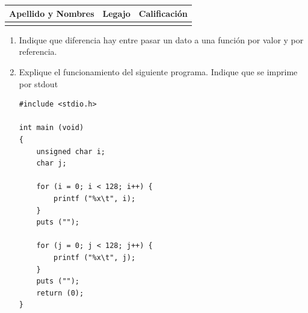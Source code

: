 \documentclass[12pt]{article} %
\begin{document}
\newpage

\noindent
  \begin{center}
   \begin{tabular}{| c | c | c |}
    \hline
     Apellido y Nombres \hspace{8cm} &  Legajo & {Calificación} \\ \hline 
      &	& \\ \hline
   \end{tabular}	
  \end{center}

\noindent


\begin{enumerate}
\item Indique que diferencia hay entre pasar un dato a una función por valor y por referencia.

\item Explique el funcionamiento del siguiente programa. Indique que se imprime por stdout

\begin{lstlisting}
#include <stdio.h>

int main (void)
{
    unsigned char i;
    char j;

    for (i = 0; i < 128; i++) {
        printf ("%x\t", i);
    }
    puts ("");
    
    for (j = 0; j < 128; j++) {
        printf ("%x\t", j);
    }
    puts ("");
    return (0);
}
\end{lstlisting}

\end{enumerate}


 
\end{document}
